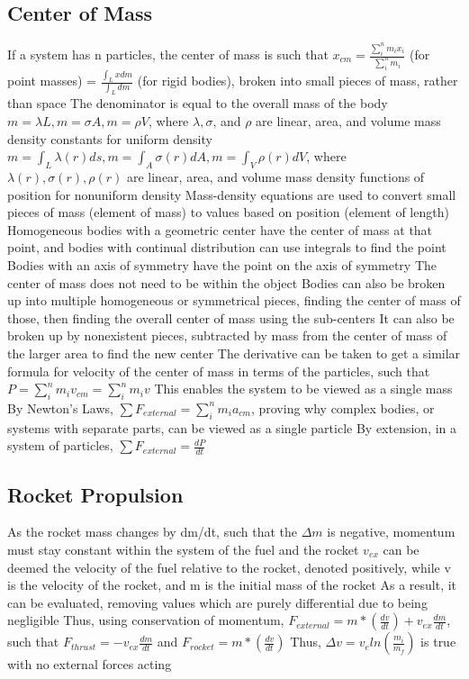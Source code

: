 \documentclass[11 pt, twoside]{article}
\newenvironment{outline*}
{
	\begin{outline}[enumerate]
	}
	{\end{outline}
}
\begin{document}
\subsection{Center of Mass}
\begin{outline*}
\1 If a system has n particles, the center of mass is such that $x_{cm} = \frac{\sum_i^n m_ix_i}{\sum_i^n m_i}$  (for point masses) = $\frac{\int_L xdm}{\int_L dm}$ (for rigid bodies), broken into small pieces of mass, rather than space
\2 The denominator is equal to the overall mass of the body
\2 $m = \lambda L, m = \sigma A, m = \rho V$, where $\lambda, \sigma$, and $\rho$ are linear, area, and volume mass density constants for uniform density
\2 $m = \int_L \lambda (r)ds, m = \int_A \sigma (r)dA, m = \int_V \rho (r) dV$, where $\lambda (r), \sigma (r), \rho (r)$ are linear, area, and volume mass density functions of position for nonuniform density
\2 Mass-density equations are used to convert small pieces of mass (element of mass) to values based on position (element of length)
\1 Homogeneous bodies with a geometric center have the center of mass at that point, and bodies with continual distribution can use integrals to find the point
\2 Bodies with an axis of symmetry have the point on the axis of symmetry
\2 The center of mass does not need to be within the object
\2 Bodies can also be broken up into multiple homogeneous or symmetrical pieces, finding the center of mass of those, then finding the overall center of mass using the sub-centers
\2 It can also be broken up by nonexistent pieces, subtracted by mass from the center of mass of the larger area to find the new center
\1 The derivative can be taken to get a similar formula for velocity of the center of mass in terms of the particles, such that $P = \sum^n_i m_iv_{cm} = \sum_i^n m_iv$
\2 This enables the system to be viewed as a single mass
\1 By Newton’s Laws, $\sum F_{external} = \sum^n_i m_ia_{cm}$, proving why complex bodies, or systems with separate parts, can be viewed as a single particle
\2 By extension, in a system of particles, $\sum F_{external} = \frac{dP}{dt}$
\end{outline*}
\subsection{Rocket Propulsion}
\begin{outline*}
\1 As the rocket mass changes by dm/dt, such that the $\Delta m$ is negative, momentum must stay constant within the system of the fuel and the rocket
\2 $v_{ex}$ can be deemed the velocity of the fuel relative to the rocket, denoted positively, while v is the velocity of the rocket, and m is the initial mass of the rocket
\2 As a result, it can be evaluated, removing values which are purely differential due to being negligible
\1 Thus, using conservation of momentum, $F_{external} = m*(\frac{dv}{dt}) + v_{ex}\frac{dm}{dt}$, such that $F_{thrust} = -v_{ex}\frac{dm}{dt}$ and $F_{rocket} = m*(\frac{dv}{dt})$
\2 Thus, $\Delta v = v_eln(\frac{m_i}{m_f})$ is true with no external forces acting
\end{outline*}
\end{document}
